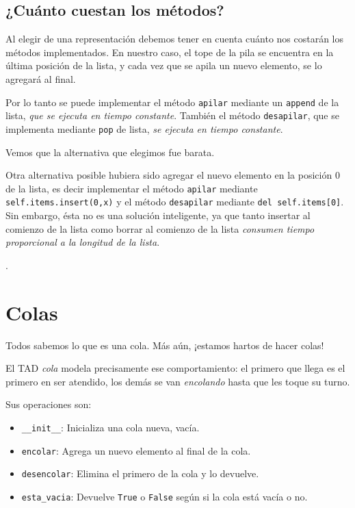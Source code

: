 \subsection{¿Cuánto cuestan los métodos?}

Al elegir de una representación debemos tener en cuenta cuánto nos costarán
los métodos implementados. En nuestro caso, el tope de la pila se encuentra
en la última posición de la lista, y cada vez que se apila un nuevo
elemento, se lo agregará al final.

Por lo tanto se puede implementar el método \lstinline!apilar! mediante un
\lstinline!append!  de la lista, {\it que se ejecuta en tiempo constante}.
También el método \lstinline!desapilar!, que se implementa mediante
\lstinline!pop! de lista, {\it se ejecuta en tiempo constante}.

Vemos que la alternativa que elegimos fue barata.

Otra alternativa posible hubiera sido agregar el nuevo elemento en la
posición $0$ de la lista, es decir implementar el método \lstinline!apilar!
mediante \lstinline|self.items.insert(0,x)| y el método
\lstinline!desapilar! mediante \lstinline|del self.items[0]|. Sin embargo,
ésta no es una solución inteligente, ya que tanto insertar al comienzo de
la lista como borrar al comienzo de la lista {\it consumen tiempo
proporcional a la longitud de la lista}.

.


\section{Colas}
Todos sabemos lo que es una cola. Más aún, ¡estamos hartos de hacer colas!

El TAD {\it cola} modela precisamente ese comportamiento: el primero que llega
es el primero en ser atendido, los demás se van {\it encolando} hasta que
les toque su turno.

Sus operaciones son:

\begin{itemize}

\item \lstinline+__init__+: Inicializa una cola nueva, vacía.

\item \lstinline!encolar!: Agrega un nuevo elemento al final de la cola.

\item \lstinline!desencolar!: Elimina el primero de la cola y lo devuelve.

\item \lstinline!esta_vacia!: Devuelve \lstinline!True! o
\lstinline!False! según si la cola está vacía o no.

\end{itemize}

